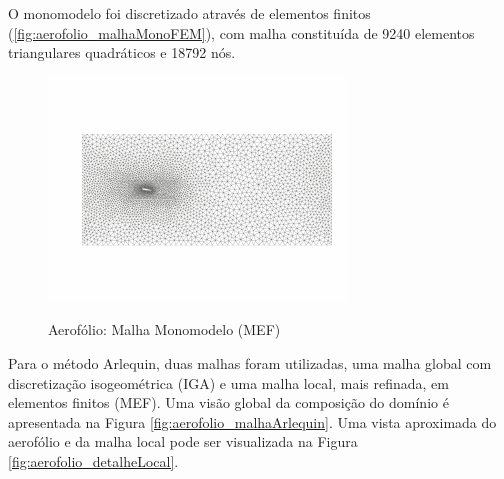 O monomodelo foi discretizado através de elementos finitos (\autoref{fig:aerofolio_malhaMonoFEM}), com malha constituída de 9240 elementos triangulares quadráticos e 18792 nós. 

\begin{figure}[!htbp]
	\caption{Aerofólio: Malha Monomodelo (MEF)}
	\centering 
	{\includegraphics[scale=2.5,trim=0cm 0.9cm 0cm 0.8cm, clip=true]{Imagens/Cap6/aerofolio_malhaMonoFEM.pdf}}	
	\label{fig:aerofolio_malhaMonoFEM}
\end{figure}

Para o método Arlequin, duas malhas foram utilizadas, uma malha global com discretização isogeométrica (IGA) e uma malha local, mais refinada, em elementos finitos (MEF). Uma visão global da composição do domínio é apresentada na Figura \ref{fig:aerofolio_malhaArlequin}. Uma vista aproximada do aerofólio e da malha local pode ser visualizada na Figura \ref{fig:aerofolio_detalheLocal}.

